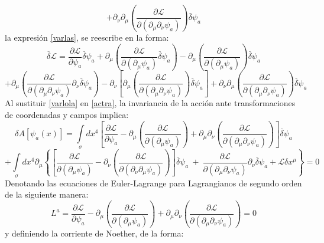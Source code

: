\documentclass[a4paper,12pt]{article}
\begin{document}
$$+\partial_{\nu}\partial_{\mu}\left(\frac{\partial\mathscr{L} }{\partial(\partial_{\mu}\partial_{\nu} \psi_a)}\right)\overset{\_}{\delta}\psi_a$$
la expresión \eqref{varlas}, se reescribe en la forma:
\begin{equation}
\overset{\_}{\delta}\mathscr{L}=\frac{\partial\mathscr{L} }{\partial \psi_a}\overset{\_}{\delta}\psi_a+\partial_{\mu}\left(\frac{\partial\mathscr{L} }{\partial(\partial_{\mu} \psi_a)}\overset{\_}{\delta} \psi_a\right)-\partial_{\mu}\left(\frac{\partial\mathscr{L} }{\partial(\partial_{\mu} \psi_a)}\right)\overset{\_}{\delta} \psi_a
\label{varlola}
\end{equation}
$$+\partial_{\mu}\left(\frac{\partial\mathscr{L} }{\partial(\partial_{\mu}\partial_{\nu} \psi_a)}\partial_{\nu}\overset{\_}{\delta} \psi_a\right)-\partial_{\nu}\left[\partial_{\mu}\left(\frac{\partial\mathscr{L} }{\partial(\partial_{\mu}\partial_{\nu} \psi_a)}\right)\overset{\_}{\delta} \psi_a\right]+\partial_{\nu}\partial_{\mu}\left(\frac{\partial\mathscr{L} }{\partial(\partial_{\mu}\partial_{\nu} \psi_a)}\right)\overset{\_}{\delta}\psi_a $$
Al sustituir \eqref{varlola} en \eqref{actra}, la invariancia de la acción ante transformaciones de coordenadas y campos implica:
\begin{equation}
\delta A[\psi_a (x)]=\int\limits_{\sigma}dx^{4}\left[\frac{\partial\mathscr{L} }{\partial \psi_a}-\partial_{\mu}\left(\frac{\partial\mathscr{L} }{\partial(\partial_{\mu} \psi_a)}\right)+\partial_{\mu}\partial_{\nu}\left(\frac{\partial\mathscr{L} }{\partial(\partial_{\mu}\partial_{\nu} \psi_a)}\right)\right]\overset{\_}{\delta}\psi_a
\label{canoe}
\end{equation}  
$$+\int\limits_{\sigma}dx^{4}\partial_{\mu}\left\{\left[\frac{\partial \mathscr{L} }{\partial(\partial_{\mu} \psi_a)}-\partial_{\nu}\left(\frac{\partial\mathscr{L} }{\partial(\partial_{\nu}\partial_{\mu} \psi_a)}  \right) \right]\overset{\_}{\delta}\psi_a\ +\ \frac{\partial\mathscr{L} }{\partial(\partial_{\mu}\partial_{\nu} \psi_a)}\partial_{\nu}\overset{\_}{\delta} \psi_a+\mathscr{L}\delta x^\mu \right\}=0$$
Denotando las ecuaciones de Euler-Lagrange para Lagrangianos de segundo orden de la siguiente manera:
\begin{equation}
L^a=\frac{\partial\mathscr{L} }{\partial \psi_a}-\partial_{\mu}\left(\frac{\partial\mathscr{L} }{\partial(\partial_{\mu} \psi_a)}\right)+\partial_{\mu}\partial_{\nu}\left(\frac{\partial\mathscr{L} }{\partial(\partial_{\mu}\partial_{\nu} \psi_a)}\right)=0
\label{la}
\end{equation}
y definiendo la corriente de Noether, de la forma:
\end{document}
